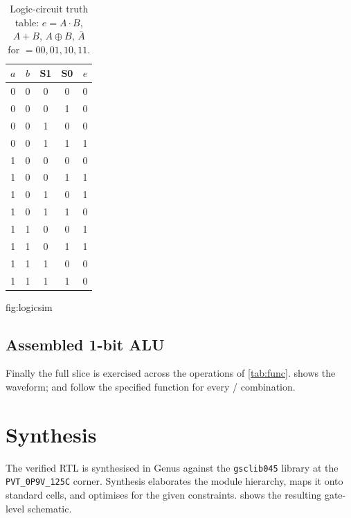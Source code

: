 \begin{table}[htbp]
\centering
\caption{Logic-circuit truth table: $e=A\!\cdot\!B$, $A\!+\!B$,
$A\!\oplus\!B$, $\overline{A}$ for $=00,01,10,11$.}
\label{tab:logic}
\small
\begin{tabular}{@{}cc cc c@{}}
\toprule
$a$ & $b$ & S1 & S0 & $e$\\
\midrule
0&0 & 0&0 & 0\\
0&0 & 0&1 & 0\\
0&0 & 1&0 & 0\\
0&0 & 1&1 & 1\\
1&0 & 0&0 & 0\\
1&0 & 0&1 & 1\\
1&0 & 1&0 & 1\\
1&0 & 1&1 & 0\\
1&1 & 0&0 & 1\\
1&1 & 0&1 & 1\\
1&1 & 1&0 & 0\\
1&1 & 1&1 & 0\\
\bottomrule
\end{tabular}
\end{table}

{fig:logicsim}

\subsection{Assembled 1-bit ALU}
Finally the full slice is exercised across the operations of
\cref{tab:func}.  shows the waveform;  and
 follow the specified function for every \sel/
combination.


\section{Synthesis}
The verified RTL is synthesised in Genus against the \texttt{gsclib045}
library at the \texttt{PVT\_0P9V\_125C} corner. Synthesis elaborates the
module hierarchy, maps it onto standard cells, and optimises for the given
constraints.  shows the resulting gate-level
schematic.


